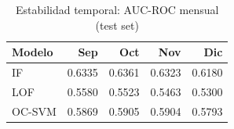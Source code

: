 \begin{table}[htbp]
\centering
\small
\caption{Estabilidad temporal: AUC-ROC mensual (test set)}
\label{tab:temporal-stability}
\begin{tabular}{lrrrr}
\toprule
Modelo & Sep & Oct & Nov & Dic \\
\midrule
  IF & 0.6335 & 0.6361 & 0.6323 & 0.6180 \\
  LOF & 0.5580 & 0.5523 & 0.5463 & 0.5300 \\
  OC-SVM & 0.5869 & 0.5905 & 0.5904 & 0.5793 \\
\bottomrule
\end{tabular}
\end{table}
